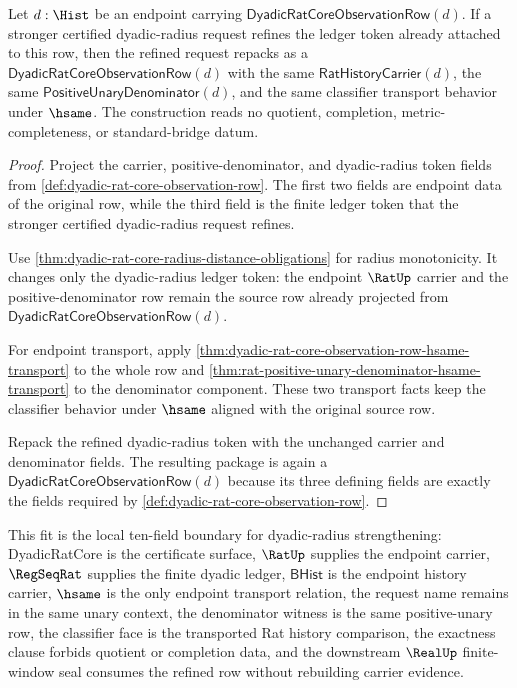 \begin{theorem}
\label{thm:dyadic-rat-core-radius-token-refinement-stability}
Let $d:\Hist$ be an endpoint carrying
$\mathsf{DyadicRatCoreObservationRow}(d)$. If a stronger certified dyadic-radius
request refines the ledger token already attached to this row, then the refined
request repacks as a $\mathsf{DyadicRatCoreObservationRow}(d)$ with the same
$\mathsf{RatHistoryCarrier}(d)$, the same
$\mathsf{PositiveUnaryDenominator}(d)$, and the same classifier transport
behavior under $\hsame$. The construction reads no quotient, completion,
metric-completeness, or standard-bridge datum.
\end{theorem}
\begin{proof}
Project the carrier, positive-denominator, and dyadic-radius token fields from
\autoref{def:dyadic-rat-core-observation-row}. The first two fields are endpoint
data of the original row, while the third field is the finite ledger token that
the stronger certified dyadic-radius request refines.

Use \autoref{thm:dyadic-rat-core-radius-distance-obligations} for radius
monotonicity. It changes only the dyadic-radius ledger token: the endpoint
$\RatUp$ carrier and the positive-denominator row remain the source row already
projected from $\mathsf{DyadicRatCoreObservationRow}(d)$.

For endpoint transport, apply
\autoref{thm:dyadic-rat-core-observation-row-hsame-transport} to the whole row
and \autoref{thm:rat-positive-unary-denominator-hsame-transport} to the
denominator component. These two transport facts keep the classifier behavior
under $\hsame$ aligned with the original source row.

Repack the refined dyadic-radius token with the unchanged carrier and
denominator fields. The resulting package is again a
$\mathsf{DyadicRatCoreObservationRow}(d)$ because its three defining fields are
exactly the fields required by
\autoref{def:dyadic-rat-core-observation-row}.
\end{proof}

This fit is the local ten-field boundary for dyadic-radius strengthening:
DyadicRatCore is the certificate surface, $\RatUp$ supplies the endpoint carrier,
$\RegSeqRat$ supplies the finite dyadic ledger, $\mathsf{BHist}$ is the endpoint
history carrier, $\hsame$ is the only endpoint transport relation, the request
name remains in the same unary context, the denominator witness is the same
positive-unary row, the classifier face is the transported Rat history
comparison, the exactness clause forbids quotient or completion data, and the
downstream $\RealUp$ finite-window seal consumes the refined row without
rebuilding carrier evidence.

